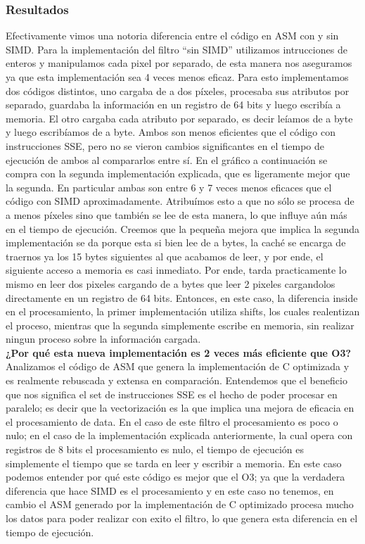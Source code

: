 \subsubsection{Resultados}
\par{Efectivamente vimos una notoria diferencia entre el código en ASM con y sin SIMD.
Para la implementación del filtro ``sin SIMD'' utilizamos intrucciones de enteros y manipulamos cada pixel por separado, de esta manera nos aseguramos ya que esta implementación sea 4 veces menos eficaz. Para esto implementamos dos códigos distintos, uno cargaba de a dos píxeles, procesaba sus atributos por separado, guardaba la información en un registro de 64 bits y luego escribía a memoria. El otro cargaba cada atributo por separado, es decir leíamos de a byte y luego escribíamos de a byte. Ambos son menos eficientes que el código con instrucciones SSE, pero no se vieron  cambios significantes en el tiempo de ejecución de ambos al compararlos entre sí. En el gráfico a continuación se compra con la segunda implementación explicada, que es ligeramente mejor que la segunda. En particular ambas son entre 6 y 7 veces menos eficaces que el código con SIMD aproximadamente. Atribuímos esto a que no sólo se procesa de a menos píxeles sino que también se lee de esta manera, lo que influye aún más en el tiempo de ejecución. Creemos que la pequeña mejora que implica la segunda implementación se da porque esta si bien lee de a bytes, la caché se encarga de traernos ya los 15 bytes siguientes al que acabamos de leer, y por ende, el siguiente acceso a memoria es casi inmediato. Por ende, tarda practicamente lo mismo en leer dos pixeles cargando de a bytes que leer 2 pixeles cargandolos directamente en un registro de 64 bits. Entonces, en este caso, la diferencia inside en el procesamiento, la primer implementación utiliza shifts, los cuales realentizan el proceso, mientras que la segunda simplemente escribe en memoria, sin realizar ningun proceso sobre la información cargada.\\
\medskip
\textbf{¿Por qué esta nueva implementación es 2 veces más eficiente que O3?} \\
Analizamos el código de ASM que genera la implementación de C optimizada y es realmente rebuscada y extensa en comparación. Entendemos que el beneficio que nos significa el set de instrucciones SSE es el hecho de poder procesar en paralelo; es decir que la vectorización es la que implica una mejora de eficacia en el procesamiento de data. En el caso de este filtro el procesamiento es poco o nulo; en el caso de la implementación explicada anteriormente, la cual opera con registros de 8 bits el procesamiento es nulo, el tiempo de ejecución es simplemente el tiempo que se tarda en leer y escribir a memoria. En este caso podemos entender por qué este código es mejor que el O3; ya que la verdadera diferencia que hace SIMD es el procesamiento y en este caso no tenemos, en cambio el ASM generado por la implementación de C optimizado procesa mucho los datos para poder realizar con exito el filtro, lo que genera esta diferencia en el tiempo de ejecución.\\
}
